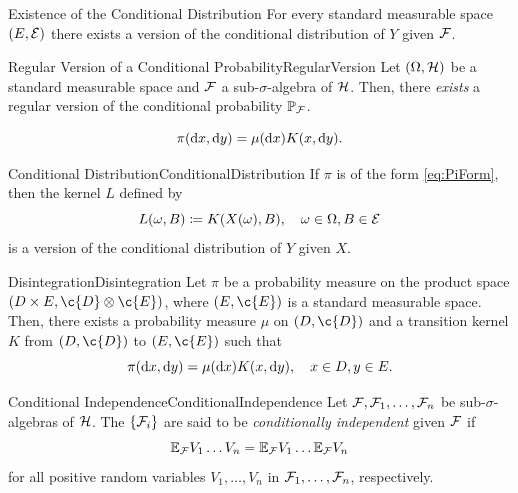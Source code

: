\begin{thm}{Existence of the Conditional Distribution}{}
For every standard measurable space $(E, \mathcal{E})$ there exists a version of the conditional distribution of $Y$ given $\mathcal{F}$.
\end{thm}

\begin{thm}{Regular Version of a Conditional Probability}{RegularVersion}
    Let $(\Omega, \mathcal{H})$ be a standard measurable space and $\mathcal{F}$ a sub-$\sigma$-algebra of $\mathcal{H}$. Then, there \emph{exists} a regular version of the conditional probability $\mathbb{P}_{\mathcal{F}}$.
\end{thm}

\begin{equation}\label{eq:PiForm}
    \pi(\mathrm{d} x, \mathrm{d} y) = \mu(\mathrm{d} x)K(x, \mathrm{d} y).
\end{equation}

\begin{thm}{Conditional Distribution}{ConditionalDistribution}
    If $\pi$ is of the form \cref{eq:PiForm}, then the kernel $L$ defined by
    \begin{equation}\label{eq:KernelDefinition}
        L(\omega, B) \coloneqq K(X(\omega), B), \quad \omega \in \Omega, B \in \mathcal{E}
    \end{equation}
    is a version of the conditional distribution of $Y$ given $X$.
\end{thm}

\begin{thm}{Disintegration}{Disintegration}
    Let $\pi$ be a probability measure on the product space $(D \times E, \c{D} \otimes \c{E})$, where $(E, \c{E})$ is a standard measurable space. Then, there exists a probability measure $\mu$ on $(D, \c{D})$ and a transition kernel $K$ from $(D, \c{D})$ to $(E, \c{E})$ such that
    \begin{equation}\label{eq:DisintegrationFormula}
        \pi(\mathrm{d} x, \mathrm{d} y) = \mu(\mathrm{d} x) K(x, \mathrm{d} y), \quad x \in D, y \in E.
    \end{equation}
\end{thm}

\begin{defn}{Conditional Independence}{ConditionalIndependence}
    Let $\mathcal{F}, \mathcal{F}_1, \dots, \mathcal{F}_n$ be sub-$\sigma$-algebras of $\mathcal{H}$. The $\{\mathcal{F}_i\}$ are said to be \emph{conditionally independent} given $\mathcal{F}$ if
    \begin{equation}\label{eq:ConditionalIndependenceDef}
        \mathbb{E}_{\mathcal{F}} V_1 \dots V_n = \mathbb{E}_{\mathcal{F}} V_1 \dots \mathbb{E}_{\mathcal{F}} V_n
    \end{equation}
    for all positive random variables $V_1, \dots, V_n$ in $\mathcal{F}_1, \dots, \mathcal{F}_n$, respectively.
\end{defn}

